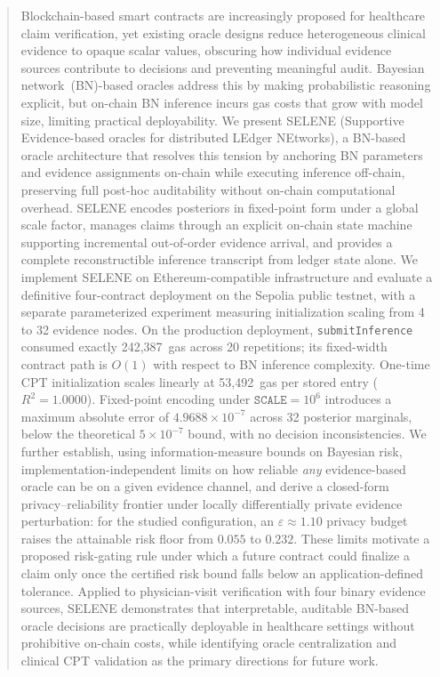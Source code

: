 \documentclass[journal]{IEEEtran}
\theoremstyle{definition}
\theoremstyle{remark}
\begin{document}
\begin{abstract}
Blockchain-based smart contracts are increasingly proposed
for healthcare claim verification, yet existing oracle designs
reduce heterogeneous clinical evidence to opaque scalar values,
obscuring how individual evidence sources contribute to
decisions and preventing meaningful audit.
Bayesian network~(BN)-based oracles address this by making
probabilistic reasoning explicit, but on-chain BN inference
incurs gas costs that grow with model size, limiting practical
deployability.
We present SELENE (Supportive Evidence-based oracles for distributed
LEdger NEtworks), a BN-based oracle architecture that resolves
this tension by anchoring BN parameters and evidence
assignments on-chain while executing inference off-chain,
preserving full post-hoc auditability without on-chain
computational overhead.
SELENE encodes posteriors in fixed-point form under a global
scale factor, manages claims through an explicit on-chain
state machine supporting incremental out-of-order evidence
arrival, and provides a complete reconstructible inference
transcript from ledger state alone.
We implement SELENE on Ethereum-compatible infrastructure
and evaluate a definitive four-contract deployment on the
Sepolia public testnet, with a separate parameterized
experiment measuring initialization scaling from 4 to
32 evidence nodes. On the production deployment,
\texttt{submitInference} consumed exactly
242{,}387~gas across 20 repetitions; its fixed-width
contract path is $O(1)$ with respect to BN inference
complexity. One-time CPT initialization scales linearly
at 53{,}492~gas per stored entry
($R^2{=}1.0000$). Fixed-point encoding under
$\texttt{SCALE}=10^6$ introduces a maximum absolute
error of $4.9688{\times}10^{-7}$ across 32 posterior
marginals, below the theoretical
$5{\times}10^{-7}$ bound, with no decision
inconsistencies.
We further establish, using information-measure bounds on
Bayesian risk, implementation-independent limits on how
reliable \emph{any} evidence-based oracle can be on a given
evidence channel, and derive a closed-form
privacy--reliability frontier under locally differentially
private evidence perturbation: for the studied
configuration, an $\varepsilon{\approx}1.10$ privacy budget
raises the attainable risk floor from $0.055$ to $0.232$.
These limits motivate a proposed risk-gating rule under
which a future contract could finalize a claim only once
the certified risk bound falls below an
application-defined tolerance.
Applied to physician-visit verification with four binary
evidence sources, SELENE demonstrates that interpretable,
auditable BN-based oracle decisions are practically
deployable in healthcare settings without prohibitive
on-chain costs, while identifying oracle centralization
and clinical CPT validation as the primary directions for
future work.
\end{abstract}
\end{document}
